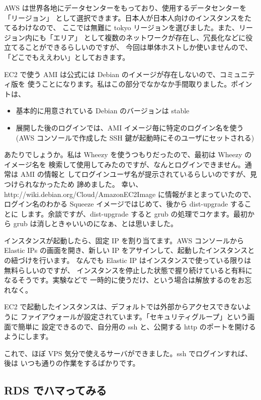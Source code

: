 \documentclass[mingoth,a4paper]{jsarticle}
\begin{document}
AWS は世界各地にデータセンターをもっており、使用するデータセンターを「リージョン」
として選択できます。日本人が日本人向けのインスタンスをたてるわけなので、
ここでは無難に tokyo リージョンを選びました。また、リージョン内にも「エリア」
として複数のネットワークが存在し、冗長化などに役立てることができるらしいのですが、
今回は単体ホストしか使いませんので、「どこでもええわい」としておきます。

EC2 で使う AMI は公式には Debian のイメージが存在しないので、コミュニティ版を
使うことになります。私はこの部分でなかなか手間取りました。ポイントは、

\begin{itemize}
\item 基本的に用意されている Debian のバージョンは stable
\item 展開した後のログインでは、AMI イメージ毎に特定のログイン名を使う (AWS コンソールで作成した SSH 鍵が起動時にそのユーザにセットされる)
\end{itemize}

あたりでしょうか。私は Wheezy を使うつもりだったので、最初は Wheezy のイメージ名を
検索して使用してみたのですが、なんとログインできません。通常は AMI の情報と
してログインユーザ名が提示されているらしいのですが、見つけられなかったため
諦めました。
幸い、http://wiki.debian.org/Cloud/AmazonEC2Image に情報がまとまっていたので、
ログイン名のわかる Squeeze イメージではじめて、後から dist-upgrade することに
します。余談ですが、dist-upgrade すると grub の処理でコケます。最初から grub
は消しときゃいいのになぁ、とは思いました。

インスタンスが起動したら、固定 IP を割り当てます。AWS コンソールから Elastic IPs
の画面を開き、新しい IP をアサインして、起動したインスタンスとの紐づけを行います。
なんでも Elastic IP はインスタンスで使っている限りは無料らしいのですが、
インスタンスを停止した状態で握り続けていると有料になるそうです。実験などで
一時的に使うだけ、という場合は解放するのをお忘れなく。

EC2 で起動したインスタンスは、デフォルトでは外部からアクセスできないように
ファイアウォールが設定されています。「セキュリティグループ」という画面で簡単に
設定できるので、自分用の ssh と、公開する http のポートを開けるようにします。

これで、ほぼ VPS 気分で使えるサーバができました。ssh でログインすれば、後は
いつも通りの作業をするばかりです。

\subsection{RDS でハマってみる}
\end{document}
